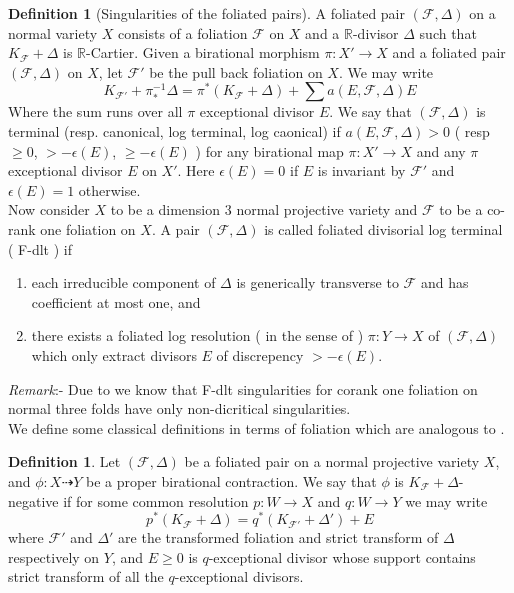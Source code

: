 \documentclass[12pt]{amsart}%
\theoremstyle{plain}
\theoremstyle{remark}
\theoremstyle{definition}
\newcommand{\<}{\leq}
\newcommand{\mbR}{\mathbb{R}}
\theoremstyle{definition}
\newtheorem{definition}[theorem]{Definition}
\theoremstyle{definition}
\numberwithin{equation}{section}
\theoremstyle{remark}
\begin{document}
\begin{definition}[Singularities of the foliated pairs]\label{pairs} 
   A foliated pair $(\mathcal{F},\Delta)$ on a normal variety $X$ consists of a foliation $\mathcal{F}$ on $X$ and a $\mbR$-divisor $\Delta$ such that $K_{\mathcal{F}}+\Delta$ is $\mbR$-Cartier. Given a birational morphism $\pi:X'\rightarrow X$ and a foliated pair $(\mathcal{F},\Delta)$ on $X$, let $\mathcal{F}'$ be the pull back foliation on $X$. We may write
   \[
   K_{\mathcal{F}'}+\pi_*^{-1}\Delta=\pi^*(K_{\mathcal{F}}+\Delta)+\sum a(E,\mathcal{F},\Delta)E
   \]
   Where the sum runs over all $\pi$ exceptional divisor $E$. We say that $(\mathcal{F},\Delta)$ is terminal (resp. canonical, log terminal, log caonical) if $a(E,\mathcal{F},\Delta)>0$ ( resp $\geqslant 0$, $>-\epsilon(E)$, $\geqslant -\epsilon(E)$ ) for any birational map $\pi:X'\rightarrow X$ and any $\pi$ exceptional divisor $E$ on $X'$. Here $\epsilon(E)=0$ if $E$ is invariant by $\mathcal{F}'$ and $\epsilon(E)=1$ otherwise.\\
   Now consider $X$ to be a dimension $3$ normal projective variety and $\mathcal{F}$ to be a co-rank one foliation on $X$. A pair $(\mathcal{F},\Delta)$ is called foliated divisorial log terminal ( F-dlt ) if 
   \begin{enumerate}
       \item each irreducible component of $\Delta$ is generically transverse to $\mathcal{F}$ and has coefficient at most one, and
       \item there exists a foliated log resolution ( in the sense of \cite[Definition $3.1$]{CS21} ) $\pi:Y\rightarrow X$ of $(\mathcal{F},\Delta)$ which only extract divisors $E$ of discrepency $>-\epsilon (E)$.
   \end{enumerate}
\end{definition}
\textit{Remark}:- Due to \cite{CS20} we know that F-dlt singularities for corank one foliation on normal three folds have only non-dicritical singularities.\\
We define some classical definitions in terms of foliation which are analogous to \cite{BCHM}.
\begin{definition}
    Let $(\mathcal{F},\Delta)$ be a foliated pair on a normal projective variety $X$, and $\phi:X\dashrightarrow Y $ be a proper birational contraction. We say that $\phi$ is $K_{\mathcal{F}}+\Delta$-negative if for some common resolution $p:W\rightarrow X$ and $q:W\rightarrow Y$ we may write\[
    p^*(K_{\mathcal{F}}+\Delta)=q^*(K_{\mathcal{F}'}+\Delta')+E
    \]
    where $\mathcal{F}'$ and $\Delta'$ are the transformed foliation and strict transform of $\Delta$ respectively on $Y$, and $E\geqslant 0$ is $q$-exceptional divisor whose support contains strict transform of all the $q$-exceptional divisors.
\end{definition}
\end{document}
